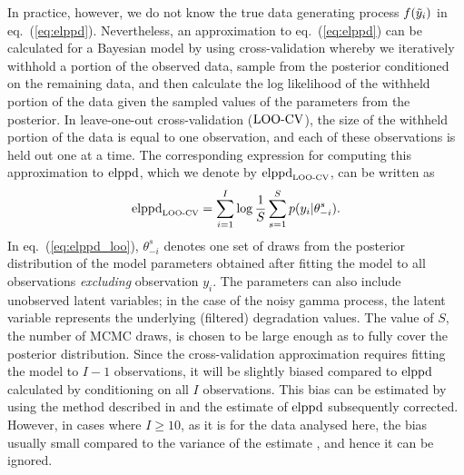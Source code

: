 \documentclass{article}
\begin{document}
In practice, however, we do not know the true data generating process $f(\Tilde{y}_i)$ in eq.~(\ref{eq:elppd}). Nevertheless, an approximation to eq.~(\ref{eq:elppd}) can be calculated for a Bayesian model by using cross-validation whereby we iteratively withhold a portion of the observed data, sample from the posterior conditioned on the remaining data, and then calculate the log likelihood of the withheld portion of the data given the sampled values of the parameters from the posterior. In leave-one-out cross-validation ($\hbox{LOO-CV}$), the size of the withheld portion of the data is equal to one observation, and each of these observations is held out one at a time. The corresponding expression for computing this approximation to $\hbox{elppd}$, which we denote by $\hbox{elppd}_{\hbox{\tiny{LOO-CV}}}$, can be written as
\begin{equation} \label{eq:elppd_loo}
    \hbox{elppd}_{\hbox{\tiny{LOO-CV}}} = \sum^I_{i = 1} \log \frac{1}{S} \sum^S_{s = 1} p(y_i|\theta_{-i}^s).
\end{equation}
In eq.~(\ref{eq:elppd_loo}), $\theta_{-i}^s$ denotes one set of draws from the posterior distribution of the model parameters obtained after fitting the model to all observations \emph{excluding} observation $y_i$. The parameters can also include unobserved latent variables; in the case of the noisy gamma process, the latent variable represents the underlying (filtered) degradation values. The value of $S$, the number of MCMC draws, is chosen to be large enough as to fully cover the posterior distribution. Since the cross-validation approximation requires fitting the model to $I-1$ observations, it will be slightly biased compared to $\hbox{elppd}$ calculated by conditioning on all $I$ observations. This bias can be estimated by using the method described in \citet{gelman_bayesian_2020} and the estimate of $\hbox{elppd}$ subsequently corrected. However, in cases where $I \geq 10$, as it is for the data analysed here, the bias usually small compared to the variance of the estimate \citep{Vehtari2017}, and hence it can be ignored.
\end{document}
